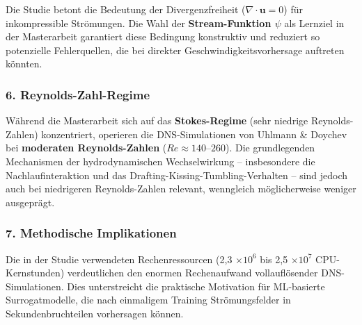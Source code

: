 \documentclass[a4paper,12pt]{article}
\begin{document}
Die Studie betont die Bedeutung der Divergenzfreiheit ($\nabla \cdot \mathbf{u} = 0$) für inkompressible Strömungen. Die Wahl der \textbf{Stream-Funktion $\psi$} als Lernziel in der Masterarbeit garantiert diese Bedingung konstruktiv und reduziert so potenzielle Fehlerquellen, die bei direkter Geschwindigkeitsvorhersage auftreten könnten.

\subsubsection*{6. Reynolds-Zahl-Regime}

Während die Masterarbeit sich auf das \textbf{Stokes-Regime} (sehr niedrige Reynolds-Zahlen) konzentriert, operieren die DNS-Simulationen von Uhlmann \& Doychev bei \textbf{moderaten Reynolds-Zahlen} ($Re \approx 140$--$260$). Die grundlegenden Mechanismen der hydrodynamischen Wechselwirkung -- insbesondere die Nachlaufinteraktion und das Drafting-Kissing-Tumbling-Verhalten -- sind jedoch auch bei niedrigeren Reynolds-Zahlen relevant, wenngleich möglicherweise weniger ausgeprägt.

\subsubsection*{7. Methodische Implikationen}

Die in der Studie verwendeten Rechenressourcen (2{,}3 $\times 10^6$ bis 2{,}5 $\times 10^7$ CPU-Kernstunden) verdeutlichen den enormen Rechenaufwand vollauflösender DNS-Simulationen. Dies unterstreicht die praktische Motivation für ML-basierte Surrogatmodelle, die nach einmaligem Training Strömungsfelder in Sekundenbruchteilen vorhersagen können.
\end{document}
